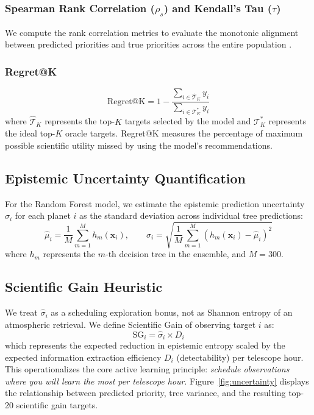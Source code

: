 \documentclass[11pt,a4paper]{article}
\begin{document}
\subsubsection{Spearman Rank Correlation ($\rho_s$) and Kendall's Tau ($\tau$)}
We compute the rank correlation metrics to evaluate the monotonic alignment between predicted priorities and true priorities across the entire population \cite{spearman1904, kendall1938}.

\subsubsection{Regret@K}
\begin{equation}
\text{Regret@K} = 1 - \frac{\sum_{i \in \hat{\mathcal{T}}_K} y_i}{\sum_{i \in \mathcal{T}_K^*} y_i}
\label{eq:regret}
\end{equation}
where $\hat{\mathcal{T}}_K$ represents the top-$K$ targets selected by the model and $\mathcal{T}_K^*$ represents the ideal top-$K$ oracle targets. Regret@K measures the percentage of maximum possible scientific utility missed by using the model's recommendations.

\subsection{Epistemic Uncertainty Quantification}

For the Random Forest model, we estimate the epistemic prediction uncertainty $\hat{\sigma}_i$ for each planet $i$ as the standard deviation across individual tree predictions:
\begin{equation}
\hat{\mu}_i = \frac{1}{M}\sum_{m=1}^{M} h_m(\mathbf{x}_i), \qquad \hat{\sigma}_i = \sqrt{\frac{1}{M}\sum_{m=1}^{M}(h_m(\mathbf{x}_i) - \hat{\mu}_i)^2}
\label{eq:tree_var}
\end{equation}
where $h_m$ represents the $m$-th decision tree in the ensemble, and $M = 300$.

\subsection{Scientific Gain Heuristic}

We treat $\hat{\sigma}_i$ as a scheduling exploration bonus, not as Shannon entropy of an atmospheric retrieval. We define Scientific Gain of observing target $i$ as:
\begin{equation}
\text{SG}_i = \hat{\sigma}_i \times D_i
\label{eq:scigain}
\end{equation}
which represents the expected reduction in epistemic entropy scaled by the expected information extraction efficiency $D_i$ (detectability) per telescope hour. This operationalizes the core active learning principle: \textit{schedule observations where you will learn the most per telescope hour}. Figure~\ref{fig:uncertainty} displays the relationship between predicted priority, tree variance, and the resulting top-20 scientific gain targets.
\end{document}
